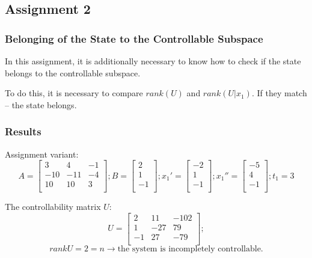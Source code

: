 \subsection{Assignment 2}
\subsubsection{Belonging of the State to the Controllable Subspace}
In this assignment, it is additionally necessary to know how to check if the state belongs to the controllable subspace.

To do this, it is necessary to compare \(rank(U)\) and \(rank(U | x_1)\). If they match -- the state belongs.

\subsubsection{Results}
Assignment variant:
\[ A = \begin{bmatrix}
        3 & 4 & -1 \\
        -10 & -11 & -4 \\
        10 & 10 & 3 \\
        \end{bmatrix}; 
        B = \begin{bmatrix}
                2 \\
                1 \\
                -1 \\
                \end{bmatrix}; 
        x_1' = \begin{bmatrix}
                -2 \\
                1 \\
                -1 \\
                \end{bmatrix}; 
        x_1'' = \begin{bmatrix}
                -5 \\
                4 \\
                -1 \\
                \end{bmatrix}; 
        t_1 = 3
\]

The controllability matrix \(U\):
\[ U = \begin{bmatrix}
        2 & 11 & -102 \\
        1 & -27 & 79 \\
        -1 & 27 & -79 \\
        \end{bmatrix};
\]
\[rankU = 2 = n \rightarrow \text{the system is incompletely controllable.}\]

